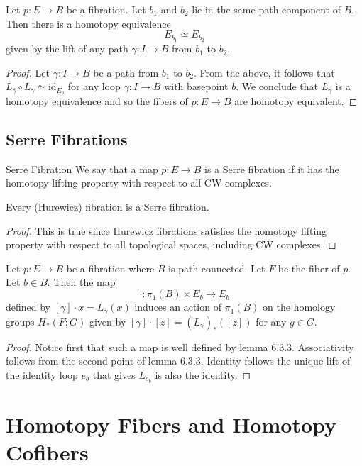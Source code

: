 \documentclass[a4paper]{article}
\begin{document}
\begin{thm}{}{} Let $p:E\to B$ be a fibration. Let $b_1$ and $b_2$ lie in the same path component of $B$. Then there is a homotopy equivalence $$E_{b_1}\simeq E_{b_2}$$ given by the lift of any path $\gamma:I\to B$ from $b_1$ to $b_2$. \tcbline
\begin{proof}
Let $\gamma:I\to B$ be a path from $b_1$ to $b_2$. From the above, it follows that $L_{\overline{\gamma}}\circ L_\gamma\simeq\text{id}_{E_b}$ for any loop $\gamma:I\to B$ with basepoint $b$. We conclude that $L_\gamma$ is a homotopy equivalence and so the fibers of $p:E\to B$ are homotopy equivalent. 
\end{proof}
\end{thm}

\subsection{Serre Fibrations}
\begin{defn}{Serre Fibration}{} We say that a map $p:E\to B$ is a Serre fibration if it has the homotopy lifting property with respect to all CW-complexes. 
\end{defn}

\begin{lmm}{}{} Every (Hurewicz) fibration is a Serre fibration. \tcbline
\begin{proof}
This is true since Hurewicz fibrations satisfies the homotopy lifting property with respect to all topological spaces, including CW complexes. 
\end{proof}
\end{lmm}

\begin{prp}{}{} Let $p:E\to B$ be a fibration where $B$ is path connected. Let $F$ be the fiber of $p$. Let $b\in B$. Then the map $$\cdot:\pi_1(B)\times E_b\to E_b$$ defined by $[\gamma]\cdot x=L_\gamma(x)$ induces an action of $\pi_1(B)$ on the homology groups $H_\ast(F;G)$ given by $[\gamma]\cdot[z]=(L_\gamma)_\ast([z])$ for any $g\in G$. \tcbline
\begin{proof}
Notice first that such a map is well defined by lemma 6.3.3. Associativity follows from the second point of lemma 6.3.3. Identity follows the unique lift of the identity loop $e_b$ that gives $L_{e_b}$ is also the identity. 
\end{proof}
\end{prp}

\pagebreak
\section{Homotopy Fibers and Homotopy Cofibers}
\end{document}
